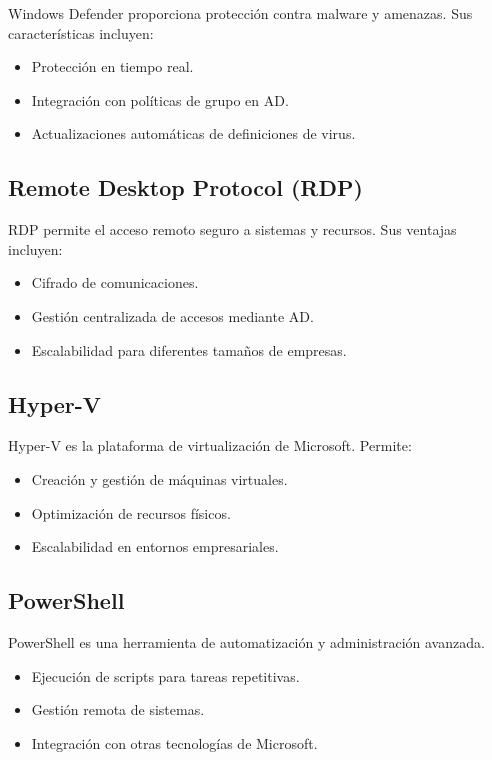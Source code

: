 Windows Defender proporciona protección contra malware y amenazas. Sus
características incluyen:
\begin{itemize}
    \item Protección en tiempo real.
    \item Integración con políticas de grupo en AD.
    \item Actualizaciones automáticas de definiciones de virus.
\end{itemize}

\subsection{Remote Desktop Protocol (RDP)}

RDP permite el acceso remoto seguro a sistemas y recursos. Sus ventajas
incluyen:
\begin{itemize}
    \item Cifrado de comunicaciones.
    \item Gestión centralizada de accesos mediante AD.
    \item Escalabilidad para diferentes tamaños de empresas.
\end{itemize}

\subsection{Hyper-V}

Hyper-V es la plataforma de virtualización de Microsoft. Permite:
\begin{itemize}
    \item Creación y gestión de máquinas virtuales.
    \item Optimización de recursos físicos.
    \item Escalabilidad en entornos empresariales.
\end{itemize}

\subsection{PowerShell}

PowerShell es una herramienta de automatización y administración avanzada.
\begin{itemize}
    \item Ejecución de scripts para tareas repetitivas.
    \item Gestión remota de sistemas.
    \item Integración con otras tecnologías de Microsoft.
\end{itemize}

